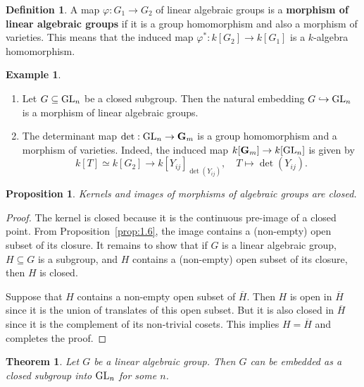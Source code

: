 \documentclass[]{pcmi}
\theoremstyle{plain}
\newtheorem{Proposition}[equation]{Proposition}
\newtheorem{Theorem}[equation]{Theorem}
\theoremstyle{definition}
\newtheorem{Definition}[equation]{Definition}
\newtheorem{Example}[equation]{Example}
\begin{document}
\begin{Definition}
    A map $\varphi : G_1 \to G_2$ of linear algebraic groups is a \textbf{morphism of linear algebraic groups} if it is a group homomorphism and also a morphism of varieties. This means that the induced map $\varphi^* : k[G_2] \to k[G_1]$ is a $k$-algebra homomorphism. 
\end{Definition}

\begin{Example}
    \phantom{h}
    \begin{enumerate}
        \item Let $G \subseteq \operatorname{GL}_n$ be a closed subgroup. Then the natural embedding $G \hookrightarrow \operatorname{GL}_n$ is a morphism of linear algebraic groups.

        \item The determinant map $\det : \operatorname{GL}_n \to \mathbf{G}_m$ is a group homomorphism and a morphism of varieties. Indeed, the induced map $k[\mathbf{G}_m] \to k[\operatorname{GL}_n]$ is given by 
        \[
            k[T] \simeq k[G_2] \longrightarrow k[Y_{ij}]_{\det (Y_{ij})}, \quad T \mapsto \det(Y_{ij}). 
        \]
    \end{enumerate}
\end{Example}

\begin{Proposition}
    Kernels and images of morphisms of algebraic groups are closed. 
\end{Proposition}
\begin{proof}
    The kernel is closed because it is the continuous pre-image of a closed point. From Proposition~\ref{prop:1.6}, the image contains a (non-empty) open subset of its closure. It remains to show that if $G$ is a linear algebraic group, $H \subseteq G$ is a subgroup, and $H$ contains a (non-empty) open subset of its closure, then $H$ is closed. 

    Suppose that $H$ contains a non-empty open subset of $\overline{H}$. Then $H$ is open in $\overline{H}$ since it is the union of translates of this open subset. But it is also closed in $\overline{H}$ since it is the complement of its non-trivial cosets. This implies $H = \overline{H}$ and completes the proof. 
\end{proof}

\begin{Theorem}
    Let $G$ be a linear algebraic group. Then $G$ can be embedded as a closed subgroup into $\operatorname{GL}_n$ for some $n$. 
\end{Theorem}
\end{document}
